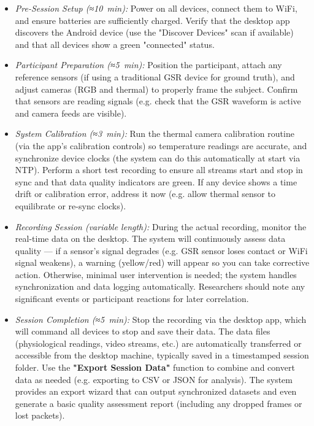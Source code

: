 \begin{itemize}
\item \textit{Pre-Session Setup (≈10 min):} Power on all devices, connect them to
  WiFi, and ensure batteries are sufficiently charged. Verify that the
  desktop app discovers the Android device (use the "Discover Devices"
  scan if available) and that all devices show a green "connected"
  status.\cite{ElectrodermalActivityWiki}\cite{ElectrodermalActivityWiki}

\item \textit{Participant Preparation (≈5 min):} Position the participant, attach
  any reference sensors (if using a traditional GSR device for ground
  truth), and adjust cameras (RGB and thermal) to properly frame the
  subject. Confirm that sensors are reading signals (e.g. check that the
  GSR waveform is active and camera feeds are visible).

\item \textit{System Calibration (≈3 min):} Run the thermal camera calibration
  routine (via the app's calibration controls) so temperature readings
  are accurate, and synchronize device clocks (the system can do this
  automatically at start via NTP). Perform a short test recording to
  ensure all streams start and stop in sync and that data quality
  indicators are
  green\cite{ElectrodermalActivityWiki}.
  If any device shows a time drift or calibration error, address it now
  (e.g. allow thermal sensor to equilibrate or re-sync clocks).

\item \textit{Recording Session (variable length):} During the actual recording,
  monitor the real-time data on the desktop. The system will
  continuously assess data quality --- if a sensor's signal degrades
  (e.g. GSR sensor loses contact or WiFi signal weakens), a warning
  (yellow/red) will appear so you can take corrective
  action\cite{ElectrodermalActivityWiki}.
  Otherwise, minimal user intervention is needed; the system handles
  synchronization and data logging automatically. Researchers should
  note any significant events or participant reactions for later
  correlation.

\item \textit{Session Completion (≈5 min):} Stop the recording via the desktop app,
  which will command all devices to stop and save their data. The data
  files (physiological readings, video streams, etc.) are automatically
  transferred or accessible from the desktop machine, typically saved in
  a timestamped session folder. Use the \textbf{"Export Session Data"}
  function to combine and convert data as needed (e.g. exporting to CSV
  or JSON for
  analysis)\cite{ElectrodermalActivityWiki}.
  The system provides an export wizard that can output synchronized
  datasets and even generate a basic quality assessment report
  (including any dropped frames or lost
  packets)\cite{ElectrodermalActivityWiki}\cite{ContactlessStressThermal2022}.


\end{itemize}
